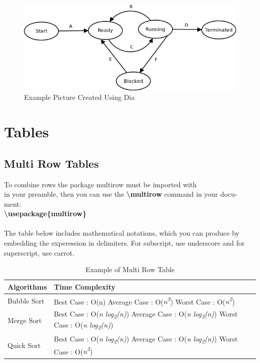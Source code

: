 \documentclass[12pt]{article}
\begin{document}
{\begin{figure}[h]
\centering
\includegraphics[scale=0.5] {OS.png}
\caption{Example Picture Created Using Dia}
\end{figure}

\section{Tables}
\subsection{ Multi Row Tables}
To combine rows the package multirow must be imported with\\
in your preamble, then you can use the \textbf{ \textbackslash multirow} command in your docu-
ment:\\
\textbf{\textbackslash usepackage\{multirow\} }\\\\
The table below includes mathematical notations, which you can produce
by embedding the experession in  \textdollar  \textdollar   delimiters. For subscript, use underscore
and for superscript, use carrot.\\


\begin{table}
\caption{Example of Multi Row Table}
\centering
\begin{tabular} {|l|  p{6cm} |}
\hline
{\textbf {Algorithms}} & {\textbf{Time Complexity}} \\ \hline \hline
 {Bubble Sort} & 
 Best Case : O(n)
\newline Average Case : O(\textit {n\textsuperscript2})
\newline Worst Case : O(\textit{n\textsuperscript2})\\
\hline
\hline
Merge Sort & 
Best Case : O(\textit{n log\textsubscript2(n)}) 
\newline Average Case : O(\textit{n log\textsubscript2(n)})
\newline Worst Case : O(\textit{n log\textsubscript2(n)}) \\
\hline
\hline
Quick Sort & 
Best Case : O(\textit{n log\textsubscript2(n)})
\newline Average Case : O(\textit{n log\textsubscript2(n)})
\newline Worst Case : O(\textit{n\textsuperscript2})  \\
\hline
\hline


\end{tabular}
\end{table}}
\end{document}
